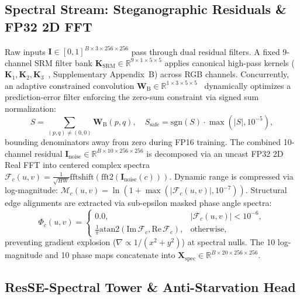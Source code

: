 \documentclass[10pt,twocolumn,letterpaper]{article}
\begin{document}
\subsection{Spectral Stream: Steganographic Residuals \& FP32 2D FFT}
\label{sec:method_spectral}

Raw inputs $\mathbf{I} \in [0, 1]^{B \times 3 \times 256 \times 256}$ pass through dual residual filters. A fixed 9-channel SRM filter bank $\mathbf{K}_{\mathrm{SRM}} \in \mathbb{R}^{9 \times 1 \times 5 \times 5}$ applies canonical high-pass kernels ($\mathbf{K}_1, \mathbf{K}_2, \mathbf{K}_3$~\cite{fridrich2012rich}, Supplementary Appendix~B) across RGB channels. Concurrently, an adaptive constrained convolution $\mathbf{W}_{\mathrm{B}} \in \mathbb{R}^{1 \times 3 \times 5 \times 5}$~\cite{bayar2018constrained} dynamically optimizes a prediction-error filter enforcing the zero-sum constraint via signed sum normalization:
\begin{equation}
\label{eq:bayar_constraint}
S = \sum_{(p, q) \ne (0, 0)} \mathbf{W}_{\mathrm{B}}(p, q), \quad S_{\mathrm{safe}} = \mathrm{sgn}(S) \cdot \max(|S|, 10^{-5}),
\end{equation}
bounding denominators away from zero during FP16 training. The combined 10-channel residual $\mathbf{I}_{\mathrm{noise}} \in \mathbb{R}^{B \times 10 \times 256 \times 256}$ is decomposed via an uncast FP32 2D Real FFT into centered complex spectra $\mathcal{F}_c(u, v) = \frac{1}{\sqrt{HW}}\mathrm{fftshift}(\mathrm{fft2}(\mathbf{I}_{\mathrm{noise}}(c)))$. Dynamic range is compressed via log-magnitude: $\mathcal{M}_c(u, v) = \ln(1 + \max(|\mathcal{F}_c(u, v)|, 10^{-7}))$. Structural edge alignments are extracted via sub-epsilon masked phase angle spectra:
\begin{equation}
\label{eq:phase_final}
\Phi_c(u, v) = \begin{cases}
0.0, & |\mathcal{F}_c(u, v)| < 10^{-6}, \\
\tfrac{1}{\pi} \mathrm{atan2}(\mathrm{Im}\,\mathcal{F}_c, \mathrm{Re}\,\mathcal{F}_c), & \text{otherwise},
\end{cases}
\end{equation}
preventing gradient explosion ($\nabla \propto 1/(x^2 + y^2)$) at spectral nulls. The 10 log-magnitude and 10 phase maps concatenate into $\mathbf{X}_{\mathrm{spec}} \in \mathbb{R}^{B \times 20 \times 256 \times 256}$.

\subsection{ResSE-Spectral Tower \& Anti-Starvation Head}
\label{sec:method_tower}
\end{document}
